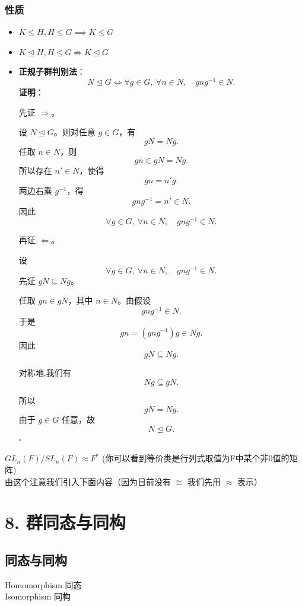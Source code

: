 \documentclass[12pt, a4paper]{article}
\begin{document}
\subsubsection*{性质}
\begin{itemize}
    \item $K \leq H, H \leq G \implies K \leq G$
    \item $K \trianglelefteq H, H \trianglelefteq G \nRightarrow K \trianglelefteq G $
    \item \textbf{正规子群判别法}：
        \[
        N\trianglelefteq G
        \iff
        \forall g\in G,\ \forall n\in N,\quad gng^{-1}\in N.
        \]
        \textbf{证明}：

        先证 \(\Rightarrow\)。

        设 \(N\trianglelefteq G\)。则对任意 \(g\in G\)，有
        \[
        gN=Ng.
        \]
        任取 \(n\in N\)，则
        \[
        gn\in gN=Ng.
        \]
        所以存在 \(n'\in N\)，使得
        \[
        gn=n'g.
        \]
        两边右乘 \(g^{-1}\)，得
        \[
        gng^{-1}=n'\in N.
        \]
        因此
        \[
        \forall g\in G,\ \forall n\in N,\quad gng^{-1}\in N.
        \]

        再证 \(\Leftarrow\)。

        设
        \[
        \forall g\in G,\ \forall n\in N,\quad gng^{-1}\in N.
        \]
        先证 \(gN\subseteq Ng\)。

        任取 \(gn\in gN\)，其中 \(n\in N\)。由假设
        \[
        gng^{-1}\in N.
        \]
        于是
        \[
        gn=(gng^{-1})g\in Ng.
        \]
        因此
        \[
        gN\subseteq Ng.
        \]

        对称地,我们有
        \[
        Ng\subseteq gN.
        \]

        所以
        \[
        gN=Ng.
        \]
        由于 \(g\in G\) 任意，故
        \[
        N\trianglelefteq G.
        \]
        \hfill \(\square\)
\end{itemize}

$ GL_n(F) / SL_n(F) \approx F^* $ (你可以看到等价类是行列式取值为F中某个非0值的矩阵) \\
由这个注意我们引入下面内容（因为目前没有 $\cong$ 我们先用 $\approx$ 表示）

\section*{8. 群同态与同构}

\subsection*{同态与同构}
Homomorphism 同态 \\
Isomorphism 同构
\end{document}
